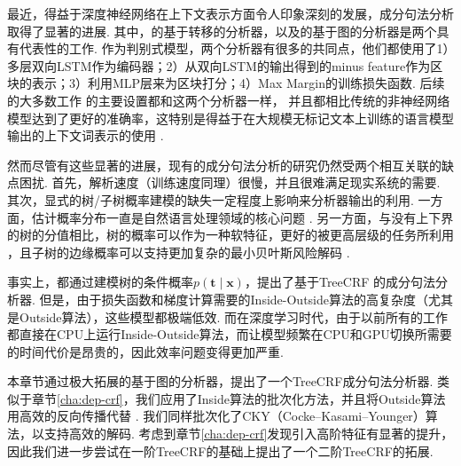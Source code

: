 最近，得益于深度神经网络在上下文表示方面令人印象深刻的发展，成分句法分析取得了显著的进展.
其中，\citet{cross-huang-2016-span}的基于转移的分析器，以及\citet{stern-etal-2017-minimal}的基于图的分析器是两个具有代表性的工作.
作为判别式模型，两个分析器有很多的共同点，他们都使用了1）多层双向LSTM作为编码器；2）从双向LSTM的输出得到的minus feature作为区块的表示；3）利用MLP层来为区块打分；4）Max Margin的训练损失函数.
后续的大多数工作 \citep{gaddy-etal-2018-whats,kitaev-klein-2018-constituency}的主要设置都和这两个分析器一样， 并且都相比传统的非神经网络模型达到了更好的准确率，这特别是得益于在大规模无标记文本上训练的语言模型输出的上下文词表示的使用 \citep{peters-etal-2018-deep,devlin-etal-2019-bert}.

然而尽管有这些显著的进展，现有的成分句法分析的研究仍然受两个相互关联的缺点困扰.
首先，解析速度（训练速度同理）很慢，并且很难满足现实系统的需要.
其次，显式的树/子树概率建模的缺失一定程度上影响来分析器输出的利用.
一方面，估计概率分布一直是自然语言处理领域的核心问题 \citep{le-zuidema-2014-inside}.
另一方面，与没有上下界的树的分值相比，树的概率可以作为一种软特征，更好的被更高层级的任务所利用 \citep{jin-etal-2020-relation}，且子树的边缘概率可以支持更加复杂的最小贝叶斯风险解码 \citep{smith-smith-2007-probabilistic}.

事实上，\citet{finkel-etal-2008-efficient,durrett-klein-2015-neural}都通过建模树的条件概率$p(\boldsymbol{t}\mid\boldsymbol{x})$，提出了基于TreeCRF \citep{lafferty-etal-2001-crf}的成分句法分析器.
但是，由于损失函数和梯度计算需要的Inside-Outside算法的高复杂度（尤其是Outside算法），这些模型都极端低效.
而在深度学习时代，由于以前所有的工作都直接在CPU上运行Inside-Outside算法，而让模型频繁在CPU和GPU切换所需要的时间代价是昂贵的，因此效率问题变得更加严重.

本章节通过极大拓展\citet{stern-etal-2017-minimal}的基于图的分析器，提出了一个TreeCRF成分句法分析器.
类似于章节\ref{cha:dep-crf}，我们应用了Inside算法的批次化方法，并且将Outside算法用高效的反向传播代替 \citep{eisner-2016-inside}.
我们同样批次化了CKY（Cocke–Kasami–Younger）算法，以支持高效的解码.
考虑到章节\ref{cha:dep-crf}发现引入高阶特征有显著的提升，因此我们进一步尝试在一阶TreeCRF的基础上提出了一个二阶TreeCRF的拓展.

